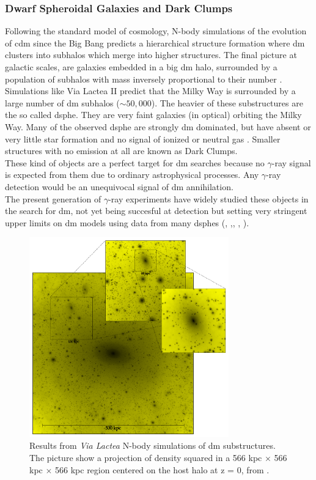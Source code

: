 \documentclass[main.tex]{subfiles}
\begin{document}
\subsubsection{Dwarf Spheroidal Galaxies and Dark Clumps}

Following the standard model of cosmology, N-body simulations of the evolution of \gls{cdm} since the Big Bang predicts a hierarchical structure formation where \gls{dm} clusters into subhalos which merge into higher structures. The final picture at galactic scales, are galaxies embedded in a big \gls{dm} halo, surrounded by a population of subhalos with mass inversely proportional to their number \cite{2008DMhalossubhalosDSphe}. Simulations like Via Lactea II predict that the Milky Way is surrounded by a large number of \gls{dm} subhalos ($\sim 50,000$). The heavier of these substructures are the so called \gls{dsphe}. They are very faint galaxies (in optical) orbiting the Milky Way. Many of the observed \gls{dsphe} are strongly \gls{dm} dominated, but have absent or very little star formation and no signal of ionized or neutral gas \cite{2007Dwarfs}. Smaller structures with no emission at all are known as Dark Clumps. \\
These kind of objects are a perfect target for \gls{dm} searches because no $\gamma$-ray signal is expected from them due to ordinary astrophysical processes. Any $\gamma$-ray detection would be an unequivocal signal of \gls{dm} annihilation. \\
The present generation of $\gamma$-ray experiments have widely studied these objects in the search for \gls{dm}, not yet being succesful at detection but setting very stringent upper limits on \gls{dm} models using data from many \glspl{dsphe} (\cite{2010DSpheFermi}, \cite{2014DSpheHESS},\cite{2018DSpheMAGIC}, \cite{2017DSpheVERITAS}, \cite{2019DSpheCombined}).
\begin{figure}
\centering
 \includegraphics[width=0.77\textwidth]{Pictures/DMsubhalos.pdf}
  \caption{Results from \textit{Via Lactea} N-body simulations of \gls{dm} substructures. The picture show a projection of density squared in a 566 kpc $\times$ 566 kpc $\times$ 566 kpc region centered on the host halo at z = 0, from \cite{2008DMhalossubhalosDSphe}.}
    \label{fig:DMstructhalos}
\end{figure}
\end{document}
